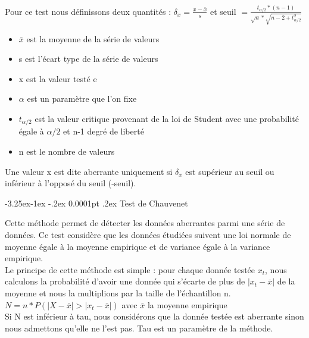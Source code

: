 \documentclass[a4paper,12pt]{article} %
\makeatletter
\renewcommand\paragraph{\@startsection{paragraph}{4}{\z@}%
                                      {-3.25ex\@plus -1ex \@minus -.2ex}%
                                      {0.0001pt \@plus .2ex}%
                                      {\normalfont\normalsize\bfseries}}
\makeatother
\begin{document}
                        
                        Pour ce test nous définissons deux quantités : $\delta_x=\frac{x-\bar{x}}{s}$ et seuil $=\frac{t_{\alpha/2}*(n-1)}{\sqrt{n}*\sqrt{n-2+t^2_{\alpha/2}}}$
                        \begin{itemize}
                        \item $\bar{x}$ est la moyenne de la série de valeurs
                        \item 	s est l'écart type de la série de valeurs
                        \item 	x est la valeur testé e
                        \item $\alpha$ est un paramètre que l'on fixe
                        \item $t_{\alpha/2}$ est la valeur critique provenant de la loi de Student avec une probabilité égale à  $\alpha/2$ et n-1 degré de liberté 
                        \item n est le nombre de valeurs 
                        \end{itemize}
                        Une valeur x est dite aberrante uniquement si $\delta_x$ est supérieur au seuil ou inférieur à l'opposé du seuil (-seuil).

					\paragraph{Test de Chauvenet}
                        					
                        Cette méthode permet de détecter les données aberrantes parmi une série de données. Ce test  considère que les données étudiées suivent une loi normale de moyenne égale à la moyenne empirique et de variance égale à la variance empirique.\\
                        
                        Le principe de cette méthode est simple : pour chaque donnée testée $x_t$, nous calculons la probabilité d'avoir une donnée qui s'écarte de plus de $|x_t-\bar{x}|$ de la moyenne et nous la multiplions par la taille de l'échantillon n.\\
                        	$N = n*P( |X-\bar{x}|>|x_t-\bar{x}|)$ avec $\bar{x}$ la moyenne empirique\\
                        	Si N est inférieur à tau, nous considérons que la donnée testée est aberrante sinon nous admettons qu'elle ne l'est pas. Tau est un paramètre de la méthode. 
                    					   
\end{document}
